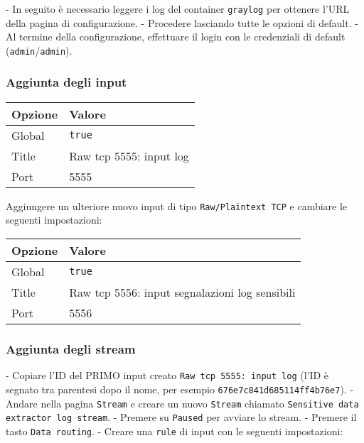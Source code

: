 \documentclass[12pt]{report}
\begin{document}
- In seguito è necessario leggere i log del container \texttt{graylog} per ottenere l'URL della pagina di configurazione.
- Procedere lasciando tutte le opzioni di default.
- Al termine della configurazione, effettuare il login con le credenziali di default (\texttt{admin}/\texttt{admin}).

\subsubsection*{Aggiunta degli input}
\label{subsubsec:aggiunta_input}

\begin{tabular}{|l|l|}
    \hline
    \textbf{Opzione} & \textbf{Valore}         \\ \hline
    Global           & \texttt{true}           \\ \hline
    Title            & Raw tcp 5555: input log \\ \hline
    Port             & 5555                    \\ \hline
\end{tabular}

Aggiungere un ulteriore nuovo input di tipo \texttt{Raw/Plaintext TCP} e cambiare le seguenti impostazioni:

\begin{tabular}{|l|l|}
    \hline
    \textbf{Opzione} & \textbf{Valore}                                \\ \hline
    Global           & \texttt{true}                                  \\ \hline
    Title            & Raw tcp 5556: input segnalazioni log sensibili \\ \hline
    Port             & 5556                                           \\ \hline
\end{tabular}

\subsubsection*{Aggiunta degli stream}
\label{subsubsec:aggiunta_stream}

- Copiare l'ID del PRIMO input creato \texttt{Raw tcp 5555: input log} (l'ID è segnato tra parentesi dopo il nome, per esempio \texttt{676e7c841d685114ff4b76e7}).
- Andare nella pagina \texttt{Stream} e creare un nuovo \texttt{Stream} chiamato \texttt{Sensitive data extractor log stream}.
- Premere su \texttt{Paused} per avviare lo stream.
- Premere il tasto \texttt{Data routing}.
- Creare una \texttt{rule} di input con le seguenti impostazioni:
\end{document}
